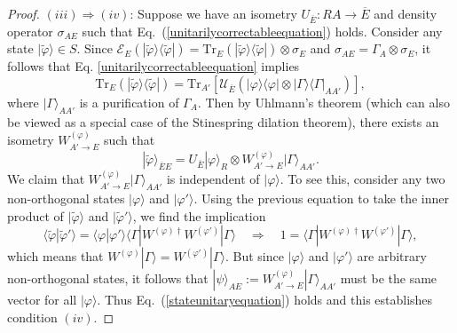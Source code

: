 \documentclass[11pt]{amsart}
\theoremstyle{definition}
\theoremstyle{definition}
\theoremstyle{definition}
\newcommand{\mc}{\mathcal}
\newcommand{\tr}{\textrm{Tr}}
\newcommand{\op}[2]{|#1\rangle\langle #2|}
\newcommand{\ip}[2]{\langle #1| #2 \rangle}
\newcommand{\1}{\mathbb{I}}
\newcommand{\wt}{\widetilde}
\def\ket#1{| #1 \rangle}
\def\bra#1{\langle #1 |}
\begin{document}
\begin{proof}
$(iii)\Rightarrow (iv)$: 
Suppose we have an isometry $U_{\overline{E}}: RA \rightarrow \overline{E}$ and density operator $\sigma_{A E}$ such that Eq.~(\ref{unitarilycorrectableequation}) holds. 
 Consider any state $\ket{\wt{\varphi}}\in S$. Since $\mc{E}_E(\op{\wt{\varphi}}{\wt{\varphi}})=\tr_E(\op{\wt{\varphi}}{\wt{\varphi}})\otimes \sigma_E$ and $\sigma_{AE}=\Gamma_A\otimes \sigma_E$, it follows that Eq. \eqref{unitarilycorrectableequation} implies 
 \[\tr_E(\op{\wt{\varphi}}{\wt{\varphi}})=\tr_{A'}[\mc{U}_{\overline{E}}(\op{\varphi}{\varphi}\otimes\op{\Gamma}{\Gamma}_{AA'})],\]
 where $\ket{\Gamma}_{AA'}$ is a purification of $\Gamma_A$.  Then by Uhlmann's theorem (which can also be viewed as a special case of the Stinespring dilation theorem), there exists an isometry $W^{(\varphi)}_{A'\to E}$ such that
 \[\ket{\wt{\varphi}}_{\overline{E}E}=U_{\overline{E}}\ket{\varphi}_R\otimes W^{(\varphi)}_{A'\to E}\ket{\Gamma}_{AA'}.\]
 We claim that $W^{(\varphi)}_{A'\to E}\ket{\Gamma}_{AA'}$ is independent of $\ket{\varphi}$.  To see this, consider any two non-orthogonal states $\ket{\varphi}$ and $\ket{\varphi'}$.  Using the previous equation to take the inner product of $\ket{\wt{\varphi}}$ and $\ket{\wt{\varphi}'}$, we find the implication 
 \[\ip{\wt{\varphi}}{\wt{\varphi}'}=\ip{\varphi}{\varphi'}\bra{\Gamma}W^{(\varphi)\dagger}W^{(\varphi')}\ket{\Gamma}\quad\Rightarrow\quad 1=\bra{\Gamma}W^{(\varphi)\dagger}W^{(\varphi')}\ket{\Gamma},\]
 which means that $W^{(\varphi)}\ket{\Gamma}=W^{(\varphi')}\ket{\Gamma}$.  But since $\ket{\varphi}$ and $\ket{\varphi'}$ are arbitrary non-orthogonal states, it follows that $\ket{\psi}_{AE}:=W^{(\varphi)}_{A'\to E}\ket{\Gamma}_{AA'}$ must be the same vector for all $\ket{\varphi}$.  Thus Eq.~(\ref{stateunitaryequation}) holds and this establishes condition $(iv)$.



\end{proof}
\end{document}
